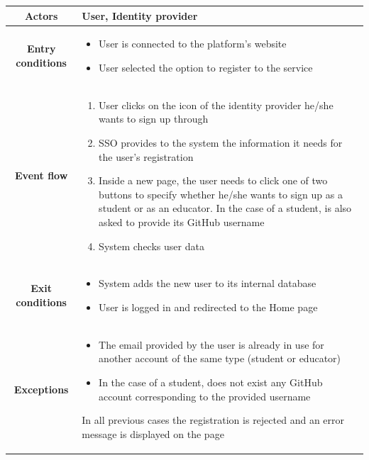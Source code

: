\begin{center}
\begin{tabular}{ |c|m{10cm}| }
        \hline
        \textbf{Actors} & User, Identity provider \\
        \hline
        \textbf{Entry conditions} &
        \begin{itemize}
            \item User is connected to the platform’s website
            \item User selected the option to register to the service
        \end{itemize} \\
        \hline
        \textbf{Event flow} &
        \begin{enumerate}
            \item User clicks on the icon of the identity provider he/she wants to sign up through
            \item SSO provides to the system the information it needs for the user’s registration
            \item Inside a new page, the user needs to click one of two buttons to specify whether he/she wants to sign up as a student or as an educator. In the case of a student, is also asked to provide its GitHub username
            \item System checks user data
        \end{enumerate} \\
        \hline
        \textbf{Exit conditions} &
        \begin{itemize}
            \item System adds the new user to its internal database
            \item User is logged in and redirected to the Home page
        \end{itemize} \\
        \hline
        \textbf{Exceptions} & 
        \begin{itemize}
            \item The email provided by the user is already in use for another account of the same type (student or educator)
            \item In the case of a student, does not exist any GitHub account corresponding to the provided username
        \end{itemize} 
        In all previous cases the registration is rejected and an error message is displayed on the page \\
        \hline
    \end{tabular}
    \begin{figure}[H]
        \hspace{25px}

\end{figure}
\end{center}
